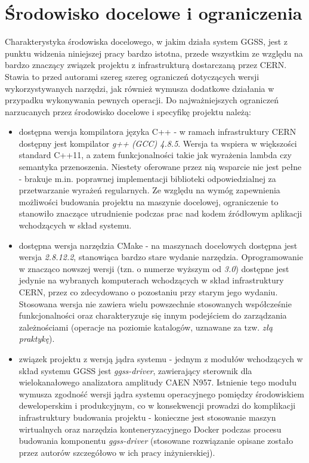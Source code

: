 \section{Środowisko docelowe i ograniczenia}
Charakterystyka środowiska docelowego, w jakim działa system GGSS, jest z punktu widzenia niniejszej pracy bardzo istotna, przede wszystkim ze względu na bardzo znaczący związek projektu z infrastrukturą dostarczaną przez CERN. Stawia to przed autorami szereg szereg ograniczeń dotyczących wersji wykorzystywanych narzędzi, jak również wymusza dodatkowe działania w przypadku wykonywania pewnych operacji. Do najważniejszych ograniczeń narzucanych przez środowisko docelowe i specyfikę projektu należą:
\begin{itemize}
    \item dostępna wersja kompilatora języka C++ - w ramach infrastruktury CERN dostępny jest kompilator \emph{g++ (GCC) 4.8.5}. Wersja ta wspiera w większości standard C++11, a zatem funkcjonalności takie jak wyrażenia lambda czy semantyka przenoszenia. Niestety oferowane przez nią wsparcie nie jest pełne - brakuje m.in. poprawnej implementacji biblioteki odpowiedzialnej za przetwarzanie wyrażeń regularnych. Ze względu na wymóg zapewnienia możliwości budowania projektu na maszynie docelowej, ograniczenie to stanowiło znaczące utrudnienie podczas prac nad kodem źródłowym aplikacji wchodzących w skład systemu.
    \item dostępna wersja narzędzia CMake - na maszynach docelowych dostępna jest wersja \emph{2.8.12.2}, stanowiąca bardzo stare wydanie narzędzia. Oprogramowanie w znacząco nowszej wersji (tzn. o numerze wyższym od \emph{3.0}) dostępne jest jedynie na wybranych komputerach wchodzących w skład infrastruktury CERN, przez co zdecydowano o pozostaniu przy starym jego wydaniu. Stosowana wersja nie zawiera wielu powszechnie stosowanych współcześnie funkcjonalności oraz charakteryzuje się innym podejściem do zarządzania zależnościami (operacje na poziomie katalogów, uznawane za tzw. \emph{złą praktykę}).
    \item związek projektu z wersją jądra systemu - jednym z modułów wchodzących w skład systemu GGSS jest \emph{ggss-driver}, zawierający sterownik dla wielokanałowego analizatora amplitudy CAEN N957. Istnienie tego modułu wymusza zgodność wersji jądra systemu operacyjnego pomiędzy środowiskiem deweloperskim i produkcyjnym, co w konsekwencji prowadzi do komplikacji infrastruktury budowania projektu - konieczne jest stosowanie maszyn wirtualnych oraz narzędzia konteneryzacyjnego Docker podczas procesu budowania komponentu \emph{ggss-driver} (stosowane rozwiązanie opisane zostało przez autorów szczegółowo w ich pracy inżynierskiej).

\end{itemize}
